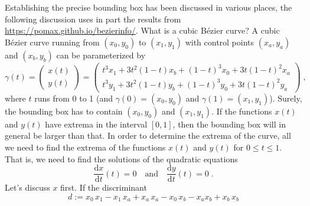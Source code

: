 Establishing the precise bounding box has been discussed in various places, the
following discussion uses in part the results from
\url{https://pomax.github.io/bezierinfo/}. What is a cubic Bézier curve? A
cubic Bézier curve running from $(x_0,y_0)$ to $(x_1,y_1)$ with control points
$(x_a,y_a)$ and $(x_b,y_b)$ can be parameterized by
%
    \begin{equation}
    \label{eq:gammaBezier}
        \gamma(t) =
        \begin{pmatrix}
            x(t) \\ y(t)
        \end{pmatrix}
        =
        \begin{pmatrix}
            t^3 x_{1} + 3 t^2 (1-t) x_{b} + (1-t)^3 x_{0} + 3 t (1-t)^2 x_{a} \\
            t^3 y_{1} + 3 t^2 (1-t) y_{b} + (1-t)^3 y_{0} + 3 t (1-t)^2 y_{a}
        \end{pmatrix}
        \;,
    \end{equation}
%
where $t$ runs from 0 to 1 (and $\gamma(0) = (x_0,y_0)$ and $\gamma(1) =
(x_1,y_1)$). Surely, the bounding box has to contain $(x_0,y_0)$ and
$(x_1,y_1)$. If the functions $x(t)$ and $y(t)$ have extrema in the interval
$[0,1]$, then the bounding box will in general be larger than that. In order to
determine the extrema of the curve, all we need to find the extrema of the
functions $x(t)$ and $y(t)$ for $0 \le t \le 1$. That is, we need to find the
solutions of the quadratic equations
%
    \begin{equation}
        \frac{\mathrm{d}x}{\mathrm{d}t}(t) = 0
            \quad\text{and}\quad
        \frac{\mathrm{d}y}{\mathrm{d}t}(t) = 0  \;.
    \end{equation}
%
%
Let's discuss $x$ first. If the discriminant
%
    \begin{equation}
        d := x_0\,x_1 - x_1\,x_a + x_a\,x_a - x_0\,x_b - x_a x_b +  x_b\,x_b
    \end{equation}
